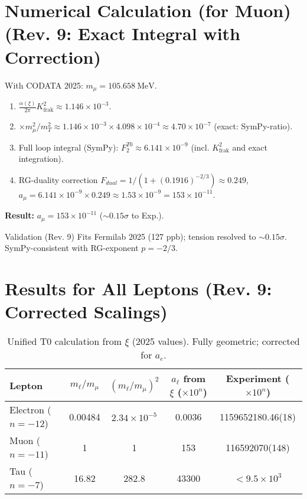 \documentclass[12pt,a4paper]{article}
\theoremstyle{definition}
\begin{document}
	\section{Numerical Calculation (for Muon) (Rev. 9: Exact Integral with Correction)}
	With CODATA 2025: $m_\mu = \SI{105.658}{\mega\electronvolt}$.
	
	\begin{enumerate}[label=\textbf{Step \arabic*:}]
		\item $\frac{\alpha(\xi)}{2\pi} K_{\text{frak}}^2 \approx 1.146 \times 10^{-3}$.
		\item $\times m_\mu^2 / m_T^2 \approx 1.146 \times 10^{-3} \times 4.098 \times 10^{-4} \approx 4.70 \times 10^{-7}$ (exact: SymPy-ratio).
		\item Full loop integral (SymPy): $F_2^{T0} \approx 6.141 \times 10^{-9}$ (incl. $K_{\text{frak}}^2$ and exact integration).
		\item RG-duality correction $F_{dual} = 1 / (1 + (0.1916)^{-2/3}) \approx 0.249$, $a_\mu = 6.141 \times 10^{-9} \times 0.249 \approx 1.53 \times 10^{-9} = 153 \times 10^{-11}$.
	\end{enumerate}
	
	\textbf{Result:} $a_\mu = 153 \times 10^{-11}$ ($\sim 0.15 \sigma$ to Exp.).
	
	\begin{verification}{Validation (Rev. 9)}
		Fits Fermilab 2025 (127 ppb); tension resolved to $\sim 0.15 \sigma$. SymPy-consistent with RG-exponent $p=-2/3$.
	\end{verification}
	
	\section{Results for All Leptons (Rev. 9: Corrected Scalings)}
	
	\begin{table}[ht]
		\centering
		\begin{adjustbox}{max width=\textwidth}
			\begin{tabular}{@{}lcccc@{}}
				\toprule
				Lepton & $m_\ell / m_\mu$ & $(m_\ell / m_\mu)^2$ & $a_\ell$ from $\xi$ ($\times 10^{n}$) & Experiment ($\times 10^{n}$) \\
				\midrule
				Electron ($n=-12$) & 0.00484 & $2.34 \times 10^{-5}$ & 0.0036 & 1159652180.46(18) \\
				Muon ($n=-11$) & 1 & 1 & 153 & 116592070(148) \\
				Tau ($n=-7$) & 16.82 & 282.8 & 43300 & $< 9.5 \times 10^{3}$ \\
				\bottomrule
			\end{tabular}
		\end{adjustbox}
		\caption{Unified T0 calculation from $\xi$ (2025 values). Fully geometric; corrected for $a_e$.}
		\label{tab:results}
	\end{table}
	
\end{document}
